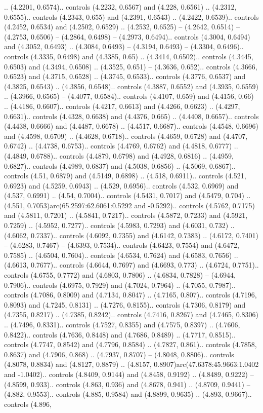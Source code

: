.. (4.2201, 0.6574).. controls (4.2232, 0.6567) and (4.228, 0.6561) .. (4.2312, 0.6555).. controls (4.2343, 0.655) and (4.2391, 0.6543) .. (4.2422, 0.6539).. controls (4.2452, 0.6534) and (4.2502, 0.6529) .. (4.2532, 0.6525) -- (4.2642, 0.6514) -- (4.2753, 0.6506) -- (4.2864, 0.6498) -- (4.2973, 0.6494).. controls (4.3004, 0.6494) and (4.3052, 0.6493) .. (4.3084, 0.6493) -- (4.3194, 0.6493) -- (4.3304, 0.6496).. controls (4.3335, 0.6498) and (4.3385, 0.65) .. (4.3414, 0.6502).. controls (4.3445, 0.6503) and (4.3494, 0.6508) .. (4.3525, 0.651) -- (4.3636, 0.652).. controls (4.3666, 0.6523) and (4.3715, 0.6528) .. (4.3745, 0.6533).. controls (4.3776, 0.6537) and (4.3825, 0.6543) .. (4.3856, 0.6548).. controls (4.3887, 0.6552) and (4.3935, 0.6559) .. (4.3966, 0.6565) -- (4.4077, 0.6584).. controls (4.4107, 0.659) and (4.4156, 0.66) .. (4.4186, 0.6607).. controls (4.4217, 0.6613) and (4.4266, 0.6623) .. (4.4297, 0.6631).. controls (4.4328, 0.6638) and (4.4376, 0.665) .. (4.4408, 0.6657).. controls (4.4438, 0.6666) and (4.4487, 0.6678) .. (4.4517, 0.6687).. controls (4.4548, 0.6696) and (4.4598, 0.6709) .. (4.4628, 0.6718).. controls (4.4659, 0.6728) and (4.4707, 0.6742) .. (4.4738, 0.6753).. controls (4.4769, 0.6762) and (4.4818, 0.6777) .. (4.4849, 0.6788).. controls (4.4879, 0.6798) and (4.4928, 0.6816) .. (4.4959, 0.6827).. controls (4.4989, 0.6837) and (4.5038, 0.6856) .. (4.5069, 0.6867).. controls (4.51, 0.6879) and (4.5149, 0.6898) .. (4.518, 0.6911).. controls (4.521, 0.6923) and (4.5259, 0.6943) .. (4.529, 0.6956).. controls (4.532, 0.6969) and (4.537, 0.6991) .. (4.54, 0.7004).. controls (4.5431, 0.7017) and (4.5479, 0.704) .. (4.551, 0.7053)arc(65.2597:62.6061:0.5292 and -0.5292).. controls (4.5762, 0.7175) and (4.5811, 0.7201) .. (4.5841, 0.7217).. controls (4.5872, 0.7233) and (4.5921, 0.7259) .. (4.5952, 0.7277).. controls (4.5983, 0.7293) and (4.6031, 0.732) .. (4.6062, 0.7337).. controls (4.6092, 0.7355) and (4.6142, 0.7383) .. (4.6172, 0.7401) -- (4.6283, 0.7467) -- (4.6393, 0.7534).. controls (4.6423, 0.7554) and (4.6472, 0.7585) .. (4.6504, 0.7604).. controls (4.6534, 0.7624) and (4.6583, 0.7656) .. (4.6613, 0.7677).. controls (4.6644, 0.7697) and (4.6693, 0.773) .. (4.6724, 0.7751).. controls (4.6755, 0.7772) and (4.6803, 0.7806) .. (4.6834, 0.7828) -- (4.6944, 0.7906).. controls (4.6975, 0.7929) and (4.7024, 0.7964) .. (4.7055, 0.7987).. controls (4.7086, 0.8009) and (4.7134, 0.8047) .. (4.7165, 0.807).. controls (4.7196, 0.8093) and (4.7245, 0.8131) .. (4.7276, 0.8155).. controls (4.7306, 0.8179) and (4.7355, 0.8217) .. (4.7385, 0.8242).. controls (4.7416, 0.8267) and (4.7465, 0.8306) .. (4.7496, 0.8331).. controls (4.7527, 0.8355) and (4.7575, 0.8397) .. (4.7606, 0.8422).. controls (4.7636, 0.8448) and (4.7686, 0.8489) .. (4.7717, 0.8515).. controls (4.7747, 0.8542) and (4.7796, 0.8584) .. (4.7827, 0.861).. controls (4.7858, 0.8637) and (4.7906, 0.868) .. (4.7937, 0.8707) -- (4.8048, 0.8806).. controls (4.8078, 0.8834) and (4.8127, 0.8879) .. (4.8157, 0.8907)arc(47.6378:45.9663:1.0402 and -1.0402).. controls (4.8409, 0.9144) and (4.8458, 0.9192) .. (4.8489, 0.9222) -- (4.8599, 0.933).. controls (4.863, 0.936) and (4.8678, 0.941) .. (4.8709, 0.9441) -- (4.882, 0.9553).. controls (4.885, 0.9584) and (4.8899, 0.9635) .. (4.893, 0.9667).. controls (4.896, 